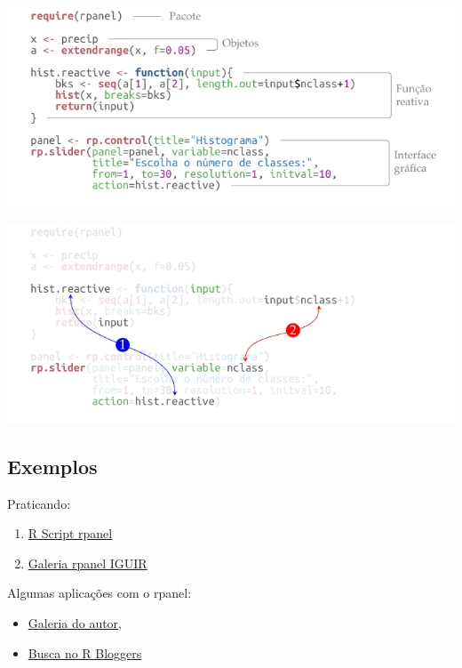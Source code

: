 \begin{frame}
\includegraphics[scale=1]{./tikz/hist_slider_rpanel-1.pdf}
\end{frame}

\begin{frame}
\includegraphics[scale=1]{./tikz/hist_slider_rpanel-2.pdf}
\end{frame}


\subsection*{Exemplos}

\begin{frame}
 Praticando:
  \begin{enumerate}
  \item
    \href{run:./R/rpanel/rpanel.R}{R Script rpanel}
  \item 
	\href{run:rpanel.html}{Galeria rpanel IGUIR}
  \end{enumerate}

  \vspace{0.5cm}
  Algumas aplicações com o rpanel:
  \begin{itemize}
  \item \href{http://www.stats.gla.ac.uk/~adrian/rpanel/}{Galeria
      do autor},
  \item \href{http://www.r-bloggers.com/?s=rpanel}{Busca no R
      Bloggers}
  \end{itemize}

\end{frame}

